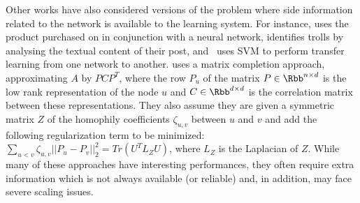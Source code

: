 \bigskip

Other works have also\done{}
considered versions of the problem where side information related to the network is available to
the learning system. For instance, \autocite{EdgeSignsRating15} uses the product purchased on
\epi{} in conjunction with a neural network, \autocite{TrollDetection15} identifies trolls by
analysing the textual content of their post, and~\autocite{SNTransfer13} uses SVM to perform
transfer learning from one network to another.
\autocite{Tang2013} uses a matrix completion approach, approximating $A$ by $PCP^T$, where the
row $P_u$ of the matrix $P\in\Rbb^{n\times d}$ is the low rank representation of the node $u$ and
$C\in\Rbb^{d\times d}$ is the correlation matrix between these representations. They also assume
they are given a symmetric matrix $Z$ of the homophily coefficients $\zeta_{u,v}$ between $u$ and
$v$ and add the following regularization term to be minimized: $\sum_{u<v} \zeta_{u,v}||P_u -
P_v||_2^2 = Tr(U^T L_Z U)$, where $L_Z$ is the Laplacian of $Z$.
While many of these approaches have interesting
performances, they often require extra information which is not always available (or reliable) and,
in addition, may face severe scaling issues.

\medskip

